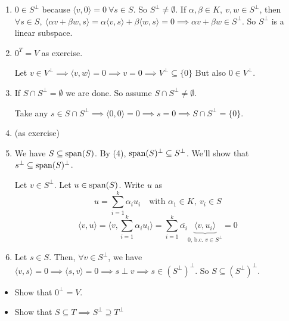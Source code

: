 \documentclass[12pt]{article}
\begin{document}
\begin{proofbox}
    \begin{enumerate}
        \item $0 \in S^\perp$ because $\langle v, 0 \rangle = 0 \ \forall s \in S$. So $S^\perp \neq \emptyset$. If $\alpha, \beta \in K,\ v, w \in S^\perp$, then $\forall s \in S,\ \langle \alpha v + \beta w, s \rangle = \alpha \langle v, s \rangle + \beta \langle w, s \rangle = 0 \implies \alpha v + \beta w \in S^\perp$. So $S^\perp$ is a linear subspace.
        \item $0^T = V$ as exercise. 
        
        Let $v \in V^\perp \implies \langle v, w \rangle = 0 \implies v = 0 \implies V^\perp \subseteq \{0\}$ But also $0 \in V^\perp$.

        \item If $S \cap S^\perp = \emptyset$ we are done. So assume $S \cap S^\perp \neq \emptyset$. 
        
        Take any $s \in S \cap S^\perp \implies \langle 0, 0 \rangle = 0 \implies s = 0 \implies S \cap S^\perp = \{0\}$.

        \item (as exercise)
        \item We have $S \subseteq \operatorname{span}(S)$. By (4), $\operatorname{span}(S)^\perp \subseteq S^\perp$. We'll show that $s^\perp \subseteq \operatorname{span}(S)^\perp$. 
        
        Let $v \in S^\perp$. Let $u \in \operatorname{span}(S)$. Write $u$ as
        $$
            u = \sum_{i = 1}^{k} \alpha_i u_i \quad \text{with } \alpha_1 \in K,\ v_i \in S
        $$
        $$
            \langle v, u \rangle = \langle v, \sum_{i = 1}^{k} \alpha_i u_i \rangle = \sum_{i = 1}^{k} \overline{\alpha_i} \underbrace{\langle v, u_i \rangle}_{0 \text{, b.c. } v \in S^\perp} = 0
        $$

        \item Let $s \in S$. Then, $\forall v \in S^\perp$, we have $\langle v, s \rangle = 0 \implies \langle s, v \rangle = 0 \implies s \perp v \implies s \in (S^\perp)^\perp$. So $S \subseteq (S^\perp)^\perp$.
    \end{enumerate}
\end{proofbox}

\begin{exercise}{}{}
    \begin{itemize}
        \item Show that $0^\perp = V$.
        \item Show that $S \subseteq T \implies S^\perp \supseteq T^\perp$
    \end{itemize}
\end{exercise}
\end{document}
